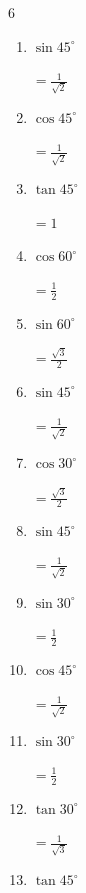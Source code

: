 \begin{multicols}{6}
\begin{enumerate}
        $\displaystyle =\frac{1}{\sqrt{3}}$

  \item $\displaystyle \sin{45^\circ}$

        $\displaystyle =\frac{1}{\sqrt{2}}$

  \item $\displaystyle \cos{45^\circ}$

        $\displaystyle =\frac{1}{\sqrt{2}}$

  \item $\displaystyle \tan{45^\circ}$

        $\displaystyle =1$

  \item $\displaystyle \cos{60^\circ}$

        $\displaystyle =\frac{1}{2}$

  \item $\displaystyle \sin{60^\circ}$

        $\displaystyle =\frac{\sqrt{3}}{2}$

  \item $\displaystyle \sin{45^\circ}$

        $\displaystyle =\frac{1}{\sqrt{2}}$

  \item $\displaystyle \cos{30^\circ}$

        $\displaystyle =\frac{\sqrt{3}}{2}$

  \item $\displaystyle \sin{45^\circ}$

        $\displaystyle =\frac{1}{\sqrt{2}}$

\columnbreak %

  \item $\displaystyle \sin{30^\circ}$

        $\displaystyle =\frac{1}{2}$

  \item $\displaystyle \cos{45^\circ}$

        $\displaystyle =\frac{1}{\sqrt{2}}$

  \item $\displaystyle \sin{30^\circ}$

        $\displaystyle =\frac{1}{2}$

  \item $\displaystyle \tan{30^\circ}$

        $\displaystyle =\frac{1}{\sqrt{3}}$

  \item $\displaystyle \tan{45^\circ}$


\end{enumerate}
\end{multicols}
